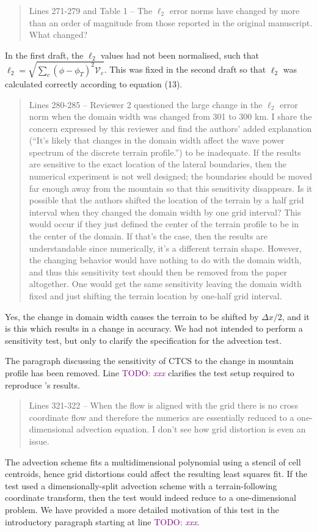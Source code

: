 \documentclass{article}
\newcommand{\TODO}[1]{\textcolor{purple}{TODO: \emph{#1}}}
\begin{document}
\begin{quotation}
 Lines 271-279 and Table 1 – The $\ell_2$ error norms have changed by more than an order  of magnitude from those reported in the original manuscript. What changed?
\end{quotation}
In the first draft, the $\ell_2$ values had not been normalised, such that $\ell_2 = \sqrt{\sum_c \left(\phi - \phi_T\right)^2 \mathcal{V}_c}$.  This was fixed in the second draft so that $\ell_2$ was calculated correctly according to equation (13).
\begin{quotation}
 Lines 280-285 – Reviewer 2 questioned the large change in the $\ell_2$ error norm when 
 the domain width was changed from 301 to 300 km. I share the concern expressed 
 by this reviewer and find the authors' added explanation (``It's likely that changes in 
 the domain width affect the wave power spectrum of the discrete terrain profile.'') to 
 be inadequate. If the results are sensitive to the exact location of the lateral 
 boundaries, then the numerical experiment is not well designed; the boundaries 
 should be moved far enough away from the mountain so that this sensitivity 
 disappears.  Is it possible that the authors shifted the location of the terrain by a half 
 grid interval when they changed the domain width by one grid interval? This would 
 occur if they just defined the center of the terrain profile to be in the center of the 
 domain. If that’s the case, then the results are understandable since numerically, it's a 
 different terrain shape. However, the changing behavior would have nothing to do 
 with the domain width, and thus this sensitivity test should then be removed from 
 the paper altogether. One would get the same sensitivity leaving the domain width 
 fixed and just shifting the terrain location by one-half grid interval.  
\end{quotation}
Yes, the change in domain width causes the terrain to be shifted by $\Delta x / 2$, and it is this which results in a change in accuracy.  We had not intended to perform a sensitivity test, but only to clarify the specification for the \citet{schaer2002} advection test.

The paragraph discussing the sensitivity of CTCS to the change in mountain profile has been removed.  Line \TODO{xxx} clarifies the test setup required to reproduce \citet{schaer2002}'s results.

\begin{quotation}
 Lines 321-322 – When the flow is aligned with the grid there is no cross coordinate 
 flow and therefore the numerics are essentially reduced to a one-dimensional 
 advection equation. I don't see how grid distortion is even an issue. 
\end{quotation}
The advection scheme fits a multidimensional polynomial using a stencil of cell centroids, hence grid distortions could affect the resulting least squares fit.  If the test used a dimensionally-split advection scheme with a terrain-following coordinate transform, then the test would indeed reduce to a one-dimensional problem.  We have provided a more detailed motivation of this test in the introductory paragraph starting at line \TODO{xxx}.
\end{document}
